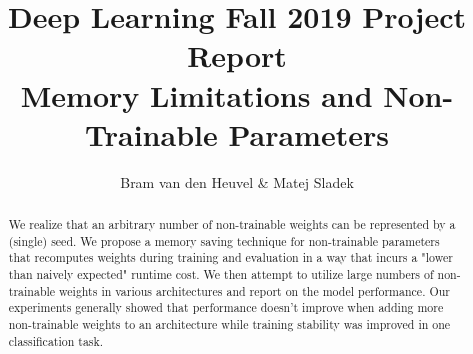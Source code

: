 \documentclass[]{article}
\title{Deep Learning Fall 2019 Project Report\\\large{Memory Limitations and Non-Trainable Parameters}}
\author{Bram van den Heuvel \& Matej Sladek}
\begin{document}
\maketitle

\begin{abstract}
	We realize that an arbitrary number of non-trainable weights can be represented by a (single) seed. We propose a memory saving technique for non-trainable parameters that recomputes weights during training and evaluation in a way that incurs a "lower than naively expected" runtime cost. We then attempt to utilize large numbers of non-trainable weights in various architectures and report on the model performance. Our experiments generally showed that performance doesn't improve when adding more non-trainable weights to an architecture while training stability was improved in one classification task.
\end{abstract}
\end{document}
